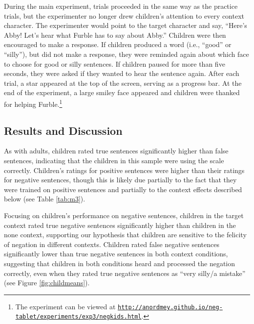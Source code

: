 \documentclass[man, noapacite]{apa2}
\begin{document}
During the main experiment, trials proceeded in the same way as the practice trials, but the experimenter no longer drew children's attention to every context character. The experimenter would point to the target character and say, ``Here's Abby! Let's hear what Furble has to say about Abby.'' Children were then encouraged to make a response. If children produced a word (i.e., ``good'' or ``silly''), but did not make a response, they were reminded again about which face to choose for good or silly sentences. If children paused for more than five seconds, they were asked if they wanted to hear the sentence again. After each trial, a star appeared at the top of the screen, serving as a progress bar. At the end of the experiment, a large smiley face appeared and children were thanked for helping Furble.\footnote{The experiment can be viewed at \href{http://anordmey.github.io/neg-tablet/experiments/exp3/negkids.html}{\nolinkurl{http://anordmey.github.io/neg-tablet/experiments/exp3/negkids.html}}.}

\subsection{Results and Discussion}

As with adults, children rated true sentences significantly higher than false sentences, indicating that the children in this sample were using the scale correctly. Children's ratings for positive sentences were higher than their ratings for negative sentences, though this is likely due partially to the fact that they were trained on positive sentences and partially to the context effects described below (see Table \ref{tab:m3}).

Focusing on children's performance on negative sentences, children in the target context rated true negative sentences significantly higher than children in the none context, supporting our hypothesis that children are sensitive to the felicity of negation in different contexts. Children rated false negative sentences significantly lower than true negative sentences in both context conditions, suggesting that children in both conditions heard and processed the negation correctly, even when they rated true negative sentences as ``very silly/a mistake'' (see Figure \ref{fig:childmeans}).
\end{document}
